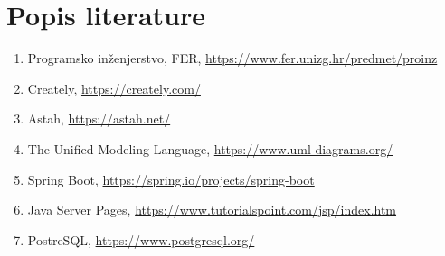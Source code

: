 \chapter*{Popis literature}
		
		\begin{enumerate}
			
			
			\item  Programsko inženjerstvo, FER, \url{https://www.fer.unizg.hr/predmet/proinz}
			
			\item Creately,
			\url{https://creately.com/}
			
			\item  Astah,
			\url{https://astah.net/}
			
			\item  The Unified Modeling Language, \url{https://www.uml-diagrams.org/}
			
			\item Spring Boot,
			\url{https://spring.io/projects/spring-boot}
			
			\item Java Server Pages,
			\url{https://www.tutorialspoint.com/jsp/index.htm}
			
			\item PostreSQL,
			\url{https://www.postgresql.org/}
			
		\end{enumerate}
		
		 